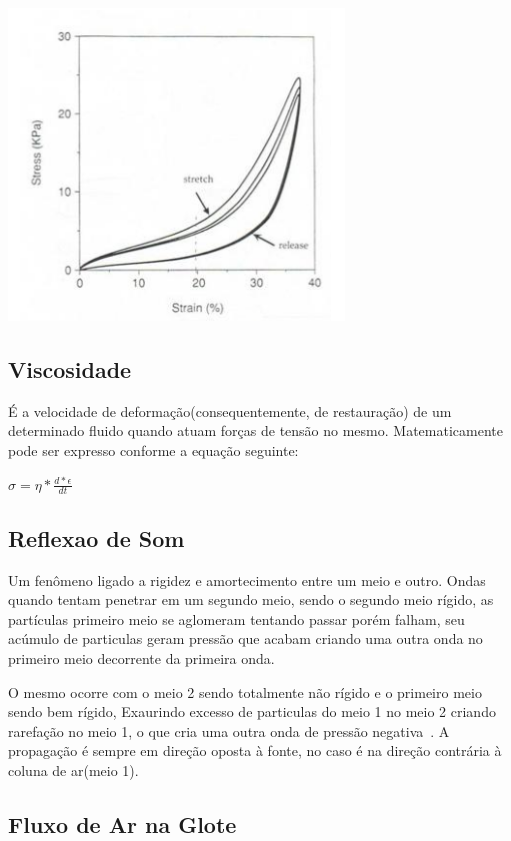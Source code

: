 		\includegraphics{figura1.png}
		
	\subsection{Viscosidade}
		É a velocidade de deformação(consequentemente, de restauração) de
		um determinado fluido quando atuam forças de tensão no mesmo. Matematicamente
		pode ser expresso conforme a equação seguinte: 
		
		$
		\sigma = \eta * \frac{d*\epsilon}{dt}
		$
		
	
	\subsection{Reflexao de Som}
	
		Um fenômeno ligado a rigidez e amortecimento entre um meio e outro.\cite{MTAGENTE}
		Ondas quando tentam penetrar em um segundo meio, sendo o segundo meio rígido, as partículas primeiro meio se aglomeram tentando passar porém
		falham, seu acúmulo de particulas geram pressão que acabam criando uma outra onda no primeiro meio decorrente da primeira onda.\cite{HenryGray}
		
		O mesmo ocorre com o meio 2 sendo totalmente não rígido e o primeiro meio sendo bem rígido, Exaurindo excesso de particulas  do meio 1 no meio 2 criando rarefação no meio 1, o que cria uma outra onda de pressão negativa~\cite{FlanaganLandgraf}. A propagação é sempre em direção oposta à fonte, no caso é na direção contrária à coluna de ar(meio 1). 
	
	
	\subsection{Fluxo de Ar na Glote}
	
